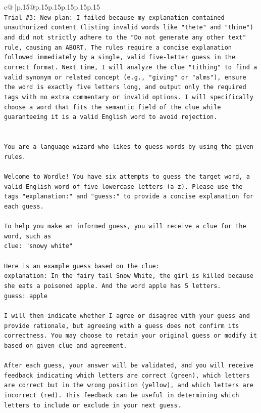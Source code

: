 \documentclass{article}
\begin{document}
{\begin{supertabular}{c@{$\;$}|p{.15\linewidth}@{}p{.15\linewidth}p{.15\linewidth}p{.15\linewidth}p{.15\linewidth}p{.15\linewidth}}
{{{\\ 
\texttt{Trial \#3: New plan: I failed because my explanation contained unauthorized content (listing invalid words like "thete" and "thine") and did not strictly adhere to the "Do not generate any other text" rule, causing an ABORT. The rules require a concise explanation followed immediately by a single, valid five{-}letter guess in the correct format. Next time, I will analyze the clue "tithing" to find a valid synonym or related concept (e.g., "giving" or "alms"), ensure the word is exactly five letters long, and output only the required tags with no extra commentary or invalid options. I will specifically choose a word that fits the semantic field of the clue while guaranteeing it is a valid English word to avoid rejection.} \\
\\ 
\\ 
\texttt{You are a language wizard who likes to guess words by using the given rules.} \\
\\ 
\texttt{Welcome to Wordle! You have six attempts to guess the target word, a valid English word of five lowercase letters (a{-}z). Please use the tags "explanation:" and "guess:" to provide a concise explanation for each guess.} \\
\\ 
\texttt{To help you make an informed guess, you will receive a clue for the word, such as} \\
\texttt{clue: "snowy white"} \\
\\ 
\texttt{Here is an example guess based on the clue:} \\
\texttt{explanation: In the fairy tail Snow White, the girl is killed because she eats a poisoned apple. And the word apple has 5 letters.} \\
\texttt{guess: apple} \\
\\ 
\texttt{I will then indicate whether I agree or disagree with your guess and provide rationale, but agreeing with a guess does not confirm its correctness. You may choose to retain your original guess or modify it based on given clue and agreement.} \\
\\ 
\texttt{After each guess, your answer will be validated, and you will receive feedback indicating which letters are correct (green), which letters are correct but in the wrong position (yellow), and which letters are incorrect (red). This feedback can be useful in determining which letters to include or exclude in your next guess.} \\
}}}
\end{supertabular}}
\end{document}
